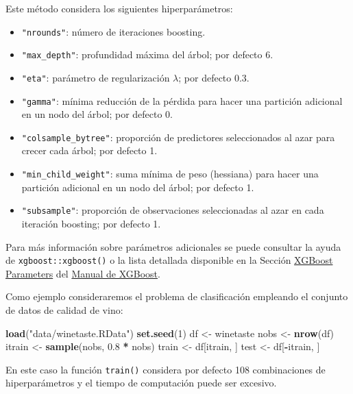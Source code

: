 \documentclass[
  spanish,
]{book}
\newenvironment{Shaded}{\begin{snugshade}}{\end{snugshade}}
\newcommand{\DecValTok}[1]{\textcolor[rgb]{0.00,0.00,0.81}{#1}}
\newcommand{\FloatTok}[1]{\textcolor[rgb]{0.00,0.00,0.81}{#1}}
\newcommand{\KeywordTok}[1]{\textcolor[rgb]{0.13,0.29,0.53}{\textbf{#1}}}
\newcommand{\NormalTok}[1]{#1}
\newcommand{\OperatorTok}[1]{\textcolor[rgb]{0.81,0.36,0.00}{\textbf{#1}}}
\newcommand{\StringTok}[1]{\textcolor[rgb]{0.31,0.60,0.02}{#1}}
\theoremstyle{break}
\theoremstyle{definition}
\theoremstyle{definition}
\theoremstyle{definition}
\theoremstyle{remark}
\begin{document}
Este método considera los siguientes hiperparámetros:

\begin{itemize}
\item
  \texttt{"nrounds"}: número de iteraciones boosting.
\item
  \texttt{"max\_depth"}: profundidad máxima del árbol; por defecto 6.
\item
  \texttt{"eta"}: parámetro de regularización \(\lambda\); por defecto 0.3.
\item
  \texttt{"gamma"}: mínima reducción de la pérdida para hacer una partición adicional en un nodo del árbol; por defecto 0.
\item
  \texttt{"colsample\_bytree"}: proporción de predictores seleccionados al azar para crecer cada árbol; por defecto 1.
\item
  \texttt{"min\_child\_weight"}: suma mínima de peso (hessiana) para hacer una partición adicional en un nodo del árbol; por defecto 1.
\item
  \texttt{"subsample"}: proporción de observaciones seleccionadas al azar en cada iteración boosting; por defecto 1.
\end{itemize}

Para más información sobre parámetros adicionales se puede consultar la ayuda de \texttt{xgboost::xgboost()} o la lista detallada disponible en la Sección \href{https://xgboost.readthedocs.io/en/latest/parameter.html}{XGBoost Parameters} del \href{https://xgboost.readthedocs.io}{Manual de XGBoost}.

Como ejemplo consideraremos el problema de clasificación empleando el conjunto de datos de calidad de vino:

\begin{Shaded}
\begin{Highlighting}[]
\KeywordTok{load}\NormalTok{(}\StringTok{"data/winetaste.RData"}\NormalTok{)}
\KeywordTok{set.seed}\NormalTok{(}\DecValTok{1}\NormalTok{)}
\NormalTok{df <-}\StringTok{ }\NormalTok{winetaste}
\NormalTok{nobs <-}\StringTok{ }\KeywordTok{nrow}\NormalTok{(df)}
\NormalTok{itrain <-}\StringTok{ }\KeywordTok{sample}\NormalTok{(nobs, }\FloatTok{0.8} \OperatorTok{*}\StringTok{ }\NormalTok{nobs)}
\NormalTok{train <-}\StringTok{ }\NormalTok{df[itrain, ]}
\NormalTok{test <-}\StringTok{ }\NormalTok{df[}\OperatorTok{-}\NormalTok{itrain, ]}
\end{Highlighting}
\end{Shaded}

En este caso la función \texttt{train()} considera por defecto 108 combinaciones de hiperparámetros y el tiempo de computación puede ser excesivo.
\end{document}
